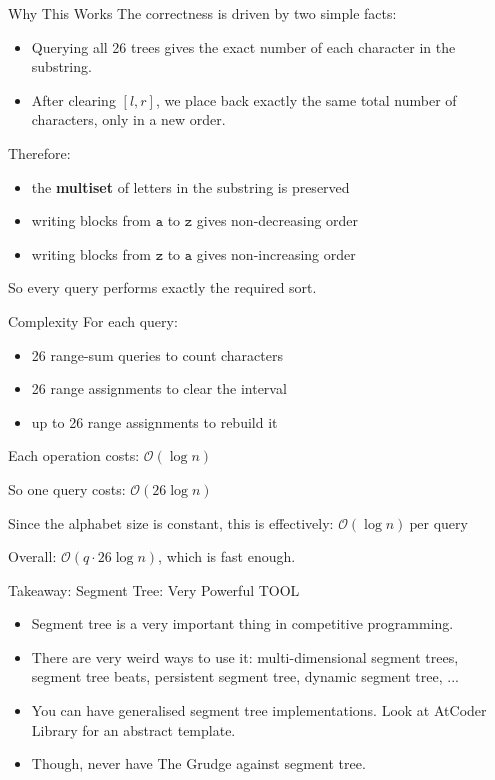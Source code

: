 \documentclass[aspectratio=169]{beamer}
\begin{document}
\begin{frame}{Why This Works}
    The correctness is driven by two simple facts:

    \begin{itemize}
        \item Querying all 26 trees gives the exact number of each character
        in the substring.
        \item After clearing \([l,r]\), we place back exactly the same total
        number of characters, only in a new order.
    \end{itemize}

    Therefore:
    \begin{itemize}
        \item the \textbf{multiset} of letters in the substring is preserved
        \item writing blocks from \(\texttt{a}\) to \(\texttt{z}\) gives
        non-decreasing order
        \item writing blocks from \(\texttt{z}\) to \(\texttt{a}\) gives
        non-increasing order
    \end{itemize}

    So every query performs exactly the required sort.
\end{frame}

\begin{frame}{Complexity}
    For each query:
    \begin{itemize}
        \item 26 range-sum queries to count characters
        \item 26 range assignments to clear the interval
        \item up to 26 range assignments to rebuild it
    \end{itemize}

    Each operation costs: $\mathcal{O}(\log n)$

    So one query costs: $\mathcal{O}(26 \log n)$

    Since the alphabet size is constant, this is effectively: $\mathcal{O}(\log n)\ \text{per query}$

    Overall: $\mathcal{O}(q \cdot 26 \log n)$, which is fast enough.
\end{frame}

\begin{frame}{Takeaway: Segment Tree: Very Powerful TOOL}
    \begin{itemize}
        \item Segment tree is a very important thing in competitive programming.
        \item There are very weird ways to use it: multi-dimensional segment trees, segment tree beats, persistent segment tree, dynamic segment tree, ...
        \item You can have generalised segment tree implementations. Look at AtCoder Library for an abstract template.
        \item Though, never have The Grudge against segment tree.
    \end{itemize}
\end{frame}
\end{document}
